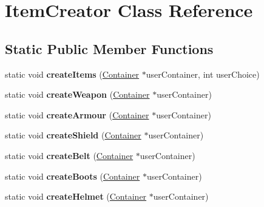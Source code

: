 \hypertarget{class_item_creator}{}\section{Item\+Creator Class Reference}
\label{class_item_creator}
\subsection*{Static Public Member Functions}
\begin{DoxyCompactItemize}
\item 
\hypertarget{class_item_creator_ad910bdef9615ace2ee24dd1a396c45bf}{}\label{class_item_creator_ad910bdef9615ace2ee24dd1a396c45bf} 
static void {\bfseries create\+Items} (\hyperlink{class_container}{Container} $\ast$user\+Container, int user\+Choice)
\item 
\hypertarget{class_item_creator_afe69a1253bac78551797eb95fa87cfd1}{}\label{class_item_creator_afe69a1253bac78551797eb95fa87cfd1} 
static void {\bfseries create\+Weapon} (\hyperlink{class_container}{Container} $\ast$user\+Container)
\item 
\hypertarget{class_item_creator_aae1b877c35f514bd040373a455a16a3e}{}\label{class_item_creator_aae1b877c35f514bd040373a455a16a3e} 
static void {\bfseries create\+Armour} (\hyperlink{class_container}{Container} $\ast$user\+Container)
\item 
\hypertarget{class_item_creator_a7c4003021fea7fbaac706b6360d8d160}{}\label{class_item_creator_a7c4003021fea7fbaac706b6360d8d160} 
static void {\bfseries create\+Shield} (\hyperlink{class_container}{Container} $\ast$user\+Container)
\item 
\hypertarget{class_item_creator_aff7ad3a96422cca1412b0f9a597c4699}{}\label{class_item_creator_aff7ad3a96422cca1412b0f9a597c4699} 
static void {\bfseries create\+Belt} (\hyperlink{class_container}{Container} $\ast$user\+Container)
\item 
\hypertarget{class_item_creator_ae96c196444fa27b43e1cb947966feb34}{}\label{class_item_creator_ae96c196444fa27b43e1cb947966feb34} 
static void {\bfseries create\+Boots} (\hyperlink{class_container}{Container} $\ast$user\+Container)
\item 
\hypertarget{class_item_creator_a879408f1449f901ff82dc830340f64d5}{}\label{class_item_creator_a879408f1449f901ff82dc830340f64d5} 
static void {\bfseries create\+Helmet} (\hyperlink{class_container}{Container} $\ast$user\+Container)
\item 
\hypertarget{class_item_creator_a83721a188d87ea4077e7f6f4fe7a6962}{}\label{class_item_creator_a83721a188d87ea4077e7f6f4fe7a6962} 

\end{DoxyCompactItemize}
